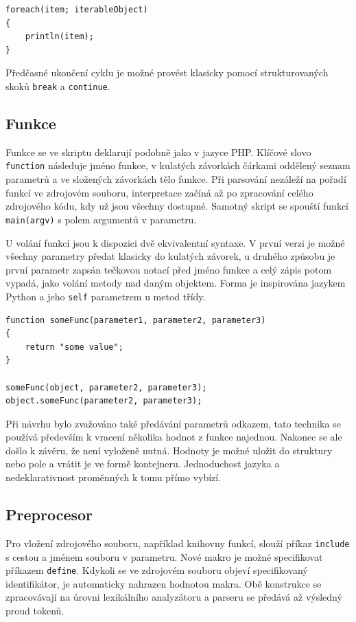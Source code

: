 \documentclass[11pt,twoside,a4paper]{book}
\begin{document}
\begin{verbatim}
foreach(item; iterableObject)
{
    println(item);
}
\end{verbatim}

Předčasné ukončení cyklu je možné provést klasicky pomocí strukturovaných skoků \texttt{break} a \texttt{continue}.


\subsection{Funkce}

Funkce se ve skriptu deklarují podobně jako v jazyce PHP. Klíčové slovo \texttt{function} následuje jméno funkce, v kulatých závorkách čárkami oddělený seznam parametrů a ve složených závorkách tělo funkce. Při parsování nezáleží na pořadí funkcí ve zdrojovém souboru, interpretace začíná až po zpracování celého zdrojového kódu, kdy už jsou všechny dostupné. Samotný skript se spouští funkcí \texttt{main(argv)} s polem argumentů v parametru.

U volání funkcí jsou k dispozici dvě ekvivalentní syntaxe. V první verzi je možné všechny parametry předat klasicky do kulatých závorek, u druhého způsobu je první parametr zapsán tečkovou notací před jméno funkce a celý zápis potom vypadá, jako volání metody nad daným objektem. Forma je inspirována jazykem Python a jeho \texttt{self} parametrem u metod třídy.

\begin{verbatim}
function someFunc(parameter1, parameter2, parameter3)
{
    return "some value";
}

someFunc(object, parameter2, parameter3);
object.someFunc(parameter2, parameter3);
\end{verbatim}

Při návrhu bylo zvažováno také předávání parametrů odkazem, tato technika se používá především k vracení několika hodnot z funkce najednou. Nakonec se ale došlo k závěru, že není vyloženě nutná. Hodnoty je možné uložit do struktury nebo pole a vrátit je ve formě kontejneru. Jednoduchost jazyka a nedeklarativnost proměnných k tomu přímo vybízí.


\subsection{Preprocesor}
\label{preprocesor}

Pro vložení zdrojového souboru, například knihovny funkcí, slouží příkaz \texttt{include} s cestou a jménem souboru v parametru. Nové makro je možné specifikovat příkazem \texttt{define}. Kdykoli se ve zdrojovém souboru objeví specifikovaný identifikátor, je automaticky nahrazen hodnotou makra. Obě konstrukce se zpracovávají na úrovni lexikálního analyzátoru a parseru se předává až výsledný proud tokenů.
\end{document}
